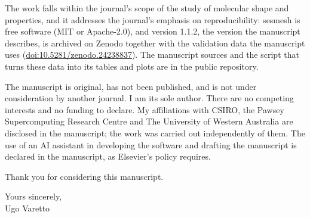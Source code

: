 \documentclass[11pt,a4paper]{article}
\newcommand{\sesmesh}{\textsf{sesmesh}}
\begin{document}
The work falls within the journal's scope of the study of molecular shape
and properties, and it addresses the journal's emphasis on reproducibility:
\sesmesh{} is free software (MIT or Apache-2.0), and version 1.1.2, the
version the manuscript describes, is archived on Zenodo together with the
validation data the manuscript uses
(\href{https://doi.org/10.5281/zenodo.24238837}{doi:10.5281/zenodo.24238837}).
The manuscript sources and the script that turns these data into its tables
and plots are in the public repository.

The manuscript is original, has not been published, and is not under
consideration by another journal. I am its sole author. There are no
competing interests and no funding to declare. My affiliations with CSIRO,
the Pawsey Supercomputing Research Centre and The University of Western
Australia are disclosed in the manuscript; the work was carried out
independently of them. The use of an AI assistant in developing the
software and drafting the manuscript is declared in the manuscript, as
Elsevier's policy requires.

Thank you for considering this manuscript.

Yours sincerely,\\[1em]
Ugo Varetto
\end{document}
